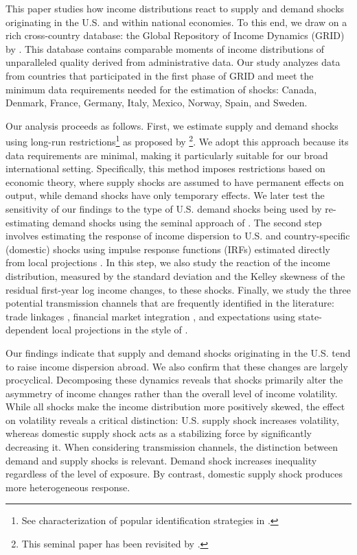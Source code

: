 \documentclass[12pt, a4paper]{article}
\begin{document}
This paper studies how income distributions react to supply and demand shocks originating in the U.S. and within national economies. To this end, we draw on a rich cross-country database: the Global Repository of Income Dynamics (GRID) by \textcite{guvenen2022global}. This database contains comparable moments of income distributions of unparalleled quality derived from administrative data. Our study analyzes data from countries that participated in the first phase of GRID and meet the minimum data requirements needed for the estimation of shocks: Canada, Denmark, France, Germany, Italy, Mexico, Norway, Spain, and Sweden.

Our analysis proceeds as follows. First, we estimate supply and demand shocks using long-run restrictions\footnote{See characterization of popular identification strategies in \textcite{ramey2016macroeconomic}.} as proposed by \textcite{blanchard1989dynamic}\footnote{This seminal paper has been revisited by \textcite{Binet2015, Herwartz2018, Keating2013}.}. We adopt this approach because its data requirements are minimal, making it particularly suitable for our broad international setting. Specifically, this method imposes restrictions based on economic theory, where supply shocks are assumed to have permanent effects on output, while demand shocks have only temporary effects. We later test the sensitivity of our findings to the type of U.S. demand shocks being used by re-estimating demand shocks using the seminal approach of \textcite{bayoumi1992shocking}. The second step involves estimating the response of income dispersion to U.S. and country-specific (domestic) shocks using impulse response functions (IRFs) estimated directly from local projections \parencite{jorda2005estimation, jorda2024local}. In this step, we also study the reaction of the income distribution, measured by the standard deviation and the Kelley skewness of the residual first-year log income changes, to these shocks. Finally, we study the three potential transmission channels that are frequently identified in the literature: trade linkages \parencite{corsetti2011multilateral}, financial market integration \parencite{faccini2016international}, and expectations \parencite{klein2021real} using state-dependent local projections in the style of \textcite{auerbach2013output}.

Our findings indicate that supply and demand shocks originating in the U.S. tend to raise income dispersion abroad. We also confirm that these changes are largely procyclical. Decomposing these dynamics reveals that shocks primarily alter the asymmetry of income changes rather than the overall level of income volatility. While all shocks make the income distribution more positively skewed, the effect on volatility reveals a critical distinction: U.S. supply shock increases volatility, whereas domestic supply shock acts as a stabilizing force by significantly decreasing it. When considering transmission channels, the distinction between demand and supply shocks is relevant. Demand shock increases inequality regardless of the level of exposure. By contrast, domestic supply shock produces more heterogeneous response.
\end{document}
